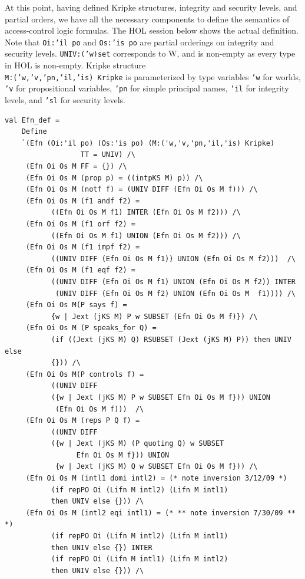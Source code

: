 At this point, having defined Kripke structures, integrity and
security levels, and partial orders, we have all the necessary
components to define the semantics of access-control logic formulas.
The HOL session below shows the actual definition. Note that
\texttt{Oi:'il po} and \texttt{Os:'is po} are partial orderings on
integrity and security levels. \texttt{UNIV:('w)set} corresponds to W,
and is non-empty as every type in HOL is non-empty. Kripke structure\\
\texttt{M:('w,'v,'pn,'il,'is) Kripke} is parameterized by type
variables \texttt{'w} for worlds, \texttt{'v} for propositional
variables, \texttt{'pn} for simple principal names, \texttt{'il} for
integrity levels, and \texttt{'sl} for security levels.
\begin{session}
  \begin{tiny}
\begin{verbatim}
val Efn_def =
    Define
    `(Efn (Oi:'il po) (Os:'is po) (M:('w,'v,'pn,'il,'is) Kripke)
                  TT = UNIV) /\
     (Efn Oi Os M FF = {}) /\
     (Efn Oi Os M (prop p) = ((intpKS M) p)) /\
     (Efn Oi Os M (notf f) = (UNIV DIFF (Efn Oi Os M f))) /\
     (Efn Oi Os M (f1 andf f2) =
           ((Efn Oi Os M f1) INTER (Efn Oi Os M f2))) /\
     (Efn Oi Os M (f1 orf f2) =
           ((Efn Oi Os M f1) UNION (Efn Oi Os M f2))) /\
     (Efn Oi Os M (f1 impf f2) =
           ((UNIV DIFF (Efn Oi Os M f1)) UNION (Efn Oi Os M f2)))  /\
     (Efn Oi Os M (f1 eqf f2) =
           ((UNIV DIFF (Efn Oi Os M f1) UNION (Efn Oi Os M f2)) INTER
            (UNIV DIFF (Efn Oi Os M f2) UNION (Efn Oi Os M  f1)))) /\
     (Efn Oi Os M(P says f) =
           {w | Jext (jKS M) P w SUBSET (Efn Oi Os M f)}) /\
     (Efn Oi Os M (P speaks_for Q) =
           (if ((Jext (jKS M) Q) RSUBSET (Jext (jKS M) P)) then UNIV else
           {})) /\
     (Efn Oi Os M(P controls f) =
           ((UNIV DIFF
           ({w | Jext (jKS M) P w SUBSET Efn Oi Os M f})) UNION
            (Efn Oi Os M f)))  /\
     (Efn Oi Os M (reps P Q f) =
           ((UNIV DIFF
           ({w | Jext (jKS M) (P quoting Q) w SUBSET
                 Efn Oi Os M f})) UNION
            {w | Jext (jKS M) Q w SUBSET Efn Oi Os M f})) /\
     (Efn Oi Os M (intl1 domi intl2) = (* note inversion 3/12/09 *)
           (if repPO Oi (Lifn M intl2) (Lifn M intl1)
           then UNIV else {})) /\
     (Efn Oi Os M (intl2 eqi intl1) = (* ** note inversion 7/30/09 ** *)
           (if repPO Oi (Lifn M intl2) (Lifn M intl1)
           then UNIV else {}) INTER
           (if repPO Oi (Lifn M intl1) (Lifn M intl2)
           then UNIV else {})) /\

\end{verbatim}
\end{tiny}
\end{session}
